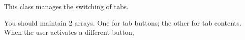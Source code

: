 This class manages the switching of tabs.

You should maintain 2 arrays. One for tab buttons; the other for tab contents.
When the user activates a different button, 
